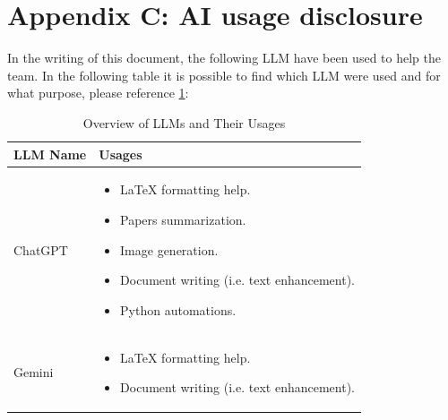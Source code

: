 \documentclass[sigconf]{acmart}
\begin{document}
\section{Appendix C: AI usage disclosure}
In the writing of this document, the following LLM have been used to help the team. In the following table it is possible to find which LLM were used and for what purpose, please reference \ref{tab:llm_usage}:

\begin{table}[t]
\centering

\begin{tabular}{p{} p{}}
\toprule
\textbf{LLM Name} & \textbf{Usages} \\
\midrule
ChatGPT &
\begin{itemize}[leftmargin=*, nosep]
    \item LaTeX formatting help.
    \item Papers summarization.
    \item Image generation.
    \item Document writing (i.e. text enhancement).
    \item Python automations.
\end{itemize} \\
\midrule
Gemini &
\begin{itemize}[leftmargin=*, nosep]
    \item LaTeX formatting help.
    \item Document writing (i.e. text enhancement).
\end{itemize} \\
\bottomrule
\end{tabular}

\caption{Overview of LLMs and Their Usages}
\label{tab:llm_usage}
\end{table}

\clearpage
\end{document}
